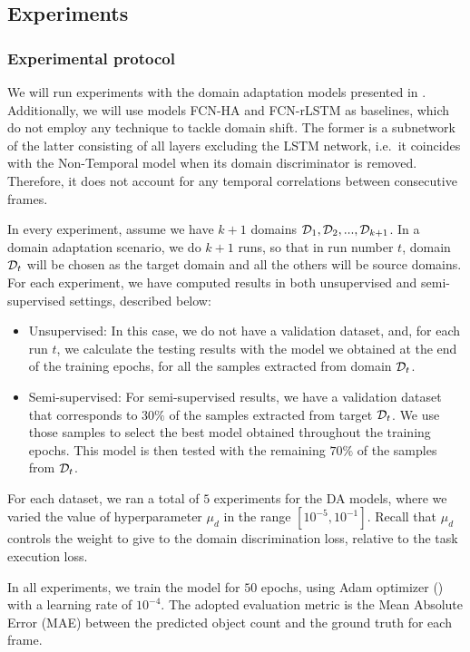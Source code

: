 \subsection{Experiments}

\subsubsection{Experimental protocol}

We will run experiments with the domain adaptation models presented in . Additionally, we will use models FCN-HA and FCN-rLSTM as baselines, which do not employ any technique to tackle domain shift. The former is a subnetwork of the latter consisting of all layers excluding the LSTM network, i.e.\ it coincides with the Non-Temporal model when its domain discriminator is removed. Therefore, it does not account for any temporal correlations between consecutive frames.

In every experiment, assume we have $k+1$ domains ${\mathcal{D}}_1, {\mathcal{D}}_2,...,{\mathcal{D}}_{k+1}$. In a domain adaptation scenario, we do $k+1$ runs, so that in run number $t$, domain ${\mathcal{D}}_t$ will be chosen as the target domain and all the others will be source domains. For each experiment, we have computed results in both unsupervised and semi-supervised settings, described below:

\begin{itemize}
	\item Unsupervised: In this case, we do not have a validation dataset, and, for each run $t$, we calculate the testing results with the model we obtained at the end of the training epochs, for all the samples extracted from domain ${\mathcal{D}}_t$.
	\item Semi-supervised: For semi-supervised results, we have a validation dataset that corresponds to $30\%$ of the samples extracted from target ${\mathcal{D}}_t$. We use those samples to select the best model obtained throughout the training epochs. This model is then tested with the remaining $70\%$ of the samples from ${\mathcal{D}}_t$.
\end{itemize}

For each dataset, we ran a total of $5$ experiments for the DA models, where we varied the value of hyperparameter $\mu_d$ in the range $[10^{-5}, 10^{-1}]$. Recall that $\mu_d$ controls the weight to give to the domain discrimination loss, relative to the task execution loss.

In all experiments, we train the model for $50$ epochs, using Adam optimizer (\citet{Kingma2014}) with a learning rate of $10^{-4}$. The adopted evaluation metric is the Mean Absolute Error (MAE) between the predicted object count and the ground truth for each frame.

